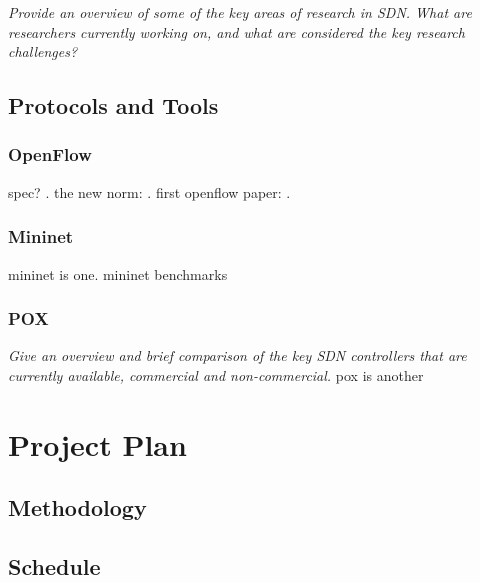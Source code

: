 \documentclass[pdftex,12pt,a4paper]{article}
\begin{document}
\emph{Provide an overview of some of the key areas of research in SDN. What are researchers currently working on, and what are considered the key research challenges?}

\subsection{Protocols and Tools}
\subsubsection{OpenFlow}
spec? \cite{onf:switch}. the new norm: \cite{onf:norm}. first openflow paper: \cite{mckeown:campus}.

\subsubsection{Mininet}
mininet is one. mininet benchmarks \cite{handigol:mininet}

\subsubsection{POX}
\emph{Give an overview and brief comparison of the key SDN controllers that are currently available, commercial and non-commercial.}
pox is another


\newpage
\section{Project Plan}
\subsection{Methodology}
\subsection{Schedule}
\end{document}
